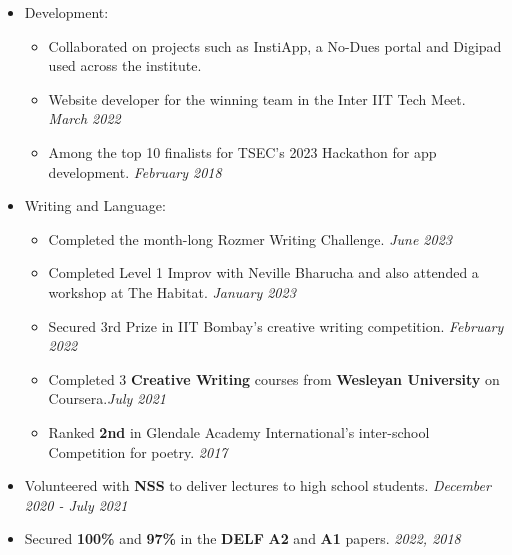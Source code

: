 \begin{itemize}[itemsep = -0.8 mm, leftmargin=*]
    \item Development:
    \vspace{-5pt}
    \begin{itemize}[itemsep = -0.8 mm,]
        \item Collaborated on projects such as InstiApp, a No-Dues portal and Digipad used across the institute.
        \item Website developer for the winning team in the Inter IIT Tech Meet. \hfill{\sl \small  March 2022}
        \item Among the top 10 finalists for TSEC's 2023 Hackathon for app development. \hfill{\sl \small  February 2018}
    \end{itemize}
    \vspace{-5pt}
    \item Writing and Language:
    \vspace{-5pt}
    \begin{itemize}
        \item Completed the month-long Rozmer Writing Challenge. \hfill{\sl \small  June 2023} 
        \item Completed Level 1 Improv with Neville Bharucha and also attended a workshop at The Habitat. \hfill{\sl \small  January 2023}
        \item Secured 3rd Prize in IIT Bombay's creative writing competition. \hfill{\sl \small  February 2022}
        \item Completed 3 \textbf{Creative Writing} courses from {\bf Wesleyan University} on Coursera.\hfill{\sl \small  July 2021}
        \item Ranked {\bf 2nd} in Glendale Academy International's inter-school Competition for poetry. \hfill{\sl \small  2017}
    \end{itemize}
    \item Volunteered with {\bf NSS} to deliver lectures to high school students. \hfill{\sl \small  December 2020 - July 2021}
    \item Secured {\bf 100\%} and {\bf 97\%} in the {\bf DELF} {\bf A2} and {\bf A1} papers. \hfill{\sl \small  2022, 2018}
 \end{itemize}